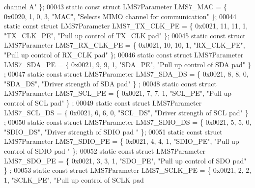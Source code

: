 \begin{DoxyCode}
{       channel A"} \};
00043 \textcolor{keyword}{static} \textcolor{keyword}{const} \textcolor{keyword}{struct }LMS7Parameter LMS7_MAC = \{ 0x0020, 1, 0, 3, \textcolor{stringliteral}{"MAC"}, \textcolor{stringliteral}{"Selects MIMO channel for
       communication"} \};
00044 \textcolor{keyword}{static} \textcolor{keyword}{const} \textcolor{keyword}{struct }LMS7Parameter LMS7_TX_CLK_PE = \{ 0x0021, 11, 11, 1, \textcolor{stringliteral}{"TX\_CLK\_PE"}, \textcolor{stringliteral}{"Pull up control of
       TX\_CLK pad"} \};
00045 \textcolor{keyword}{static} \textcolor{keyword}{const} \textcolor{keyword}{struct }LMS7Parameter LMS7_RX_CLK_PE = \{ 0x0021, 10, 10, 1, \textcolor{stringliteral}{"RX\_CLK\_PE"}, \textcolor{stringliteral}{"Pull up control of
       RX\_CLK pad"} \};
00046 \textcolor{keyword}{static} \textcolor{keyword}{const} \textcolor{keyword}{struct }LMS7Parameter LMS7_SDA_PE = \{ 0x0021, 9, 9, 1, \textcolor{stringliteral}{"SDA\_PE"}, \textcolor{stringliteral}{"Pull up control of SDA pad"} \}
      ;
00047 \textcolor{keyword}{static} \textcolor{keyword}{const} \textcolor{keyword}{struct }LMS7Parameter LMS7_SDA_DS = \{ 0x0021, 8, 8, 0, \textcolor{stringliteral}{"SDA\_DS"}, \textcolor{stringliteral}{"Driver strength of SDA pad"} \}
      ;
00048 \textcolor{keyword}{static} \textcolor{keyword}{const} \textcolor{keyword}{struct }LMS7Parameter LMS7_SCL_PE = \{ 0x0021, 7, 7, 1, \textcolor{stringliteral}{"SCL\_PE"}, \textcolor{stringliteral}{"Pull up control of SCL pad"} \}
      ;
00049 \textcolor{keyword}{static} \textcolor{keyword}{const} \textcolor{keyword}{struct }LMS7Parameter LMS7_SCL_DS = \{ 0x0021, 6, 6, 0, \textcolor{stringliteral}{"SCL\_DS"}, \textcolor{stringliteral}{"Driver strength of SCL pad"} \}
      ;
00050 \textcolor{keyword}{static} \textcolor{keyword}{const} \textcolor{keyword}{struct }LMS7Parameter LMS7_SDIO_DS = \{ 0x0021, 5, 5, 0, \textcolor{stringliteral}{"SDIO\_DS"}, \textcolor{stringliteral}{"Driver strength of SDIO pad
      "} \};
00051 \textcolor{keyword}{static} \textcolor{keyword}{const} \textcolor{keyword}{struct }LMS7Parameter LMS7_SDIO_PE = \{ 0x0021, 4, 4, 1, \textcolor{stringliteral}{"SDIO\_PE"}, \textcolor{stringliteral}{"Pull up control of SDIO pad
      "} \};
00052 \textcolor{keyword}{static} \textcolor{keyword}{const} \textcolor{keyword}{struct }LMS7Parameter LMS7_SDO_PE = \{ 0x0021, 3, 3, 1, \textcolor{stringliteral}{"SDO\_PE"}, \textcolor{stringliteral}{"Pull up control of SDO pad"} \}
      ;
00053 \textcolor{keyword}{static} \textcolor{keyword}{const} \textcolor{keyword}{struct }LMS7Parameter LMS7_SCLK_PE = \{ 0x0021, 2, 2, 1, \textcolor{stringliteral}{"SCLK\_PE"}, \textcolor{stringliteral}{"Pull up control of SCLK pad
}
\end{DoxyCode}
